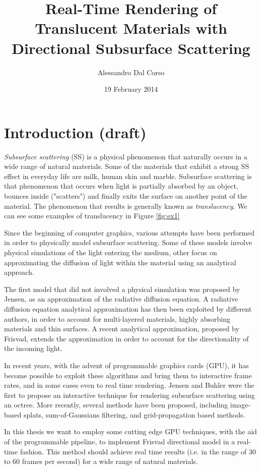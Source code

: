 \documentclass[12pt, twoside,a4paper]{article}
\begin{document}
\title{Real-Time Rendering of Translucent Materials with Directional Subsurface Scattering}
\date{19 February 2014}
\author{Alessandro Dal Corso}
\maketitle
\section{Introduction (draft)}
\emph{Subsurface scattering} (SS) is a physical phenomenon that naturally occurs in a wide range of natural materials. Some of the materials that exhibit a strong SS effect in everyday life are milk, human skin and marble. Subsurface scattering is that phenomenon that occurs when light is partially absorbed by an object, bounces inside ("scatters") and finally exits the surface on another point of the material. The phenomenon that results is generally known as \emph{translucency}. We can see some examples of translucency in Figure \ref{fig:ex1}

Since the beginning of computer graphics, various attempts have been performed in order to physically model subsurface scattering. Some of these models involve physical simulations of the light entering the medium, other focus on approximating the diffusion of light within the material using an analytical approach.
 

The first model that did not involved a physical simulation was proposed by Jensen, as an approximation of the radiative diffusion equation. A radiative diffusion equation analytical approximation has then been exploited by different authors, in order to account for multi-layered materials, highly absorbing materials and thin surfaces. A recent analytical approximation, proposed by Frisvad, extends the approximation in order to account for the directionality of the incoming light. 


In recent years, with the advent of programmable graphics cards (GPU), it has become possible to exploit these algorithms and bring them to interactive frame rates, and in some cases even to real time rendering. Jensen and Buhler were the first to propose an interactive technique for rendering subsurface scattering using an octree. More recently, several methods have been proposed, including image-based splats, sum-of-Gaussians filtering, and grid-propagation based methods.

In this thesis we want to employ some cutting edge GPU techniques, with the aid of the programmable pipeline, to implement Frisvad directional model in a real-time fashion. This method should achieve real time results (i.e. in the range of 30 to 60 frames per second) for a wide range of natural materials.
\end{document}
